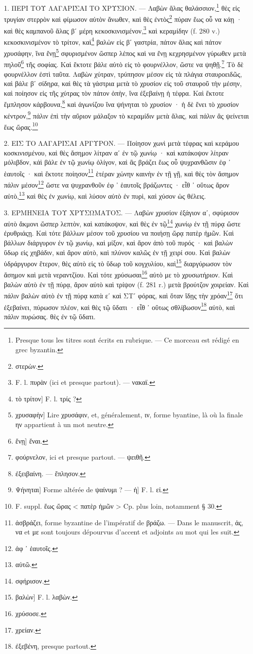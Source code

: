 \documentclass[a4paper, 11pt, oneside, polutonikogreek, french]{article}
\begin{document}
\bigskip

1. ΠΕΡΙ ΤΟΥ ΛΑΓΑΡΙΣΑΙ ΤΟ ΧΡΥΣΙΟΝ. --- Λαβὼν ἅλας θαλάσσιον,\footnote{Presque tous les titres sont écrits en rubrique. --- Ce morceau est rédigé en grec byzantin.} θὲς εἰς τρυγίαν στερρὸν καὶ φίμωσον αὐτὸν ἄνωθεν, καὶ θὲς ἐντὸς\footnote{στερὼν.} πύραν ἕως οὗ να κάῃ · καὶ θὲς καμπανοῦ ἅλας βʹ μέρη κεκοσκινισμένον,\footnote{F. l. πυρὰν (ici et presque partout). --- νακαϊ.} καὶ κεραμίδην (f. 280 v.) κεκοσκινισμένον τὸ τρίτον, καὶ\footnote{τὸ τρίτον] F. l. τρίς ?} βαλὼν εἰς βʹ γαστρία, πάτον ἅλας καὶ πάτον χρυσάφην, ἵνα ἔνῃ\footnote{χρυσαφὴν] Lire χρυσάφιν, et, généralement, ιν, forme byantine, là où la finale ην appartient à un mot neutre.} σφυρισμένον ὥσπερ λέπος καὶ να ἔνῃ κεχρησμένον γύρωθεν μετὰ πηλοῦ\footnote{ἔνῃ] ἔναι.} τῆς σοφίας. Καὶ ἔκτοτε βάλε αὐτὸ εἰς τὸ φουρνέλλον, ὥστε να ψηθῇ.\footnote{φούρνελον, ici et presque partout. --- ψειθῆ.} Τὸ δὲ φουρνέλλον ἐστὶ ταῦτα. Λαβὼν χύτραν, τρύπησον μέσον εἰς τὰ πλάγια σταυροειδῶς, καὶ βάλε βʹ σίδηρα, καὶ θὲς τὰ γάστρια μετὰ τὸ χρυσίον εἰς τοῦ σταυροῦ τὴν μέσην, καὶ ποίησον εἰς τῆς χύτρας τὸν πάτον ὀπὴν, ἵνα ἐξεβαίνῃ ἡ τέφρα. Καὶ ἔκτοτε ἔμπλησον κάρβουνα,\footnote{ἐξειβαίνη. --- ἔπλησον.} καὶ ἀγωνίζου ἵνα ψήνηται τὸ χρυσίον · ἡ δὲ ἔνει τὸ χρυσίον κέντρον,\footnote{Ψήνηται] Forme altérée de ψαίνυμι ? --- ἡ] F. l. εἰ.} πάλιν ἐπὶ τὴν αὔριον μάλαξον τὸ κεραμίδιν μετὰ ἅλας, καὶ πάλιν ἂς ψείνεται ἕως ὥρας.\footnote{F. suppl. ἕως ὥρας < πατὲρ ἡμῶν > Cp. plus loin, notamment § 30.}

2. ΕΙΣ ΤΟ ΛΑΓΑΡΙΣΑΙ ΑΡΓΥΡΟΝ. --- Ποίησον χωνὶ μετὰ τέφρας καὶ κεράμου κοσκινισμένου, καὶ θὲς ἄσημον λίτραν αʹ ἐν τῷ χωνίῳ · καὶ κατάκοψον λίτραν μόλιβδον, κάὶ βάλε ἐν τῷ χωνίῳ ὀλίγον, καὶ ἂς βράζει ἕως οὗ ψυχρανθῶσιν ἐφ ᾽ ἑαυτοῖς · καὶ ἔκτοτε ποίησον\footnote{ἀσβράζει, forme byzantine de l'impératif de βράζω. --- Dans le manuscrit, ἀς, να et με sont toujours dépourvus d'accent et adjoints au mot qui les suit.} ἑτέραν χώνην καινὴν ἐν τῇ γῇ, καὶ θὲς τὸν ἄσημον πάλιν μέσον\footnote{ἀφ ᾽ ἑαυτοῖς.} ὥστε να ψυχρανθοῦν ἐφ ᾽ ἑαυτοῖς βράζωντες · εἶθ ᾽ οὕτως ἄρον αὐτὸ,\footnote{αὐτῶ.} καὶ θὲς ἐν χωνίῳ, καὶ λύσον αὐτὸ ἐν πυρὶ, καὶ χύσον ὡς θέλεις.

3. ΕΡΜΗΝΕΙΑ ΤΟΥ ΧΡΥΣΩΜΑΤΟΣ. --- Λαβὼν χρυσίον ἑξάγιον αʹ, σφύρισον αὐτὸ ἄκμονι ὥσπερ λεπτὸν, καὶ κατάκοψον, καὶ θὲς ἐν τῷ\footnote{σφήρισον.} χωνίῳ ἐν τῇ πύρᾳ ὥστε ἐρυθριάςῃ. Καὶ τότε βάλλων μέσον τοῦ χρυσίου να ποιήσῃ ὥρᾳ πατὲρ ἡμῶν. Καὶ βάλλων διάργυρον ἐν τῷ χωνίῳ, καὶ μίξον, καὶ ἄρον ἀπὸ τοῦ πυρός · καὶ βαλὼν ὕδωρ εἰς χηβάδιν, καὶ ἄρον αὐτὸ, καὶ πλύνον καλῶς ἐν τῇ χειρί σου. Καὶ βαλὼν ὑδράργυρον ἕτερον, θὲς αὐτὸ εἰς τὸ ὕδωρ τοῦ κογχυλίου, καὶ\footnote{βαλὼν] F. l. λαβὼν.} διαργύρωσον τὸν ἄσημον καὶ μετὰ νεραντζίου. Καὶ τότε χρύσωσαι\footnote{χρύσοσε.} αὐτὸ με τὸ χρυσωτήριον. Καὶ βαλὼν αὐτὸ ἐν τῇ πύρᾳ, ἄρον αὐτὸ καὶ τρίψον (f. 281 r.) μετὰ βρούτζον χοιρείαν. Καὶ πάλιν βαλὼν αὐτὸ ἐν τῇ πύρᾳ κατὰ εʹ καὶ ΣΤʹ φόρας, καὶ ὅταν ἴδῃς τὴν χρόαν\footnote{χρείαν.} ὅτι ἐξεβαίνει, πύρωσον πλέον, καὶ θὲς τῷ ὕδατι · εἶθ ᾽ οὕτως σθλίβωσον\footnote{ἐξεβένη, presque partout.} αὐτὸ, καὶ πάλιν πυρώσας. θὲς ἐν τῷ ὕδατι.
\end{document}
